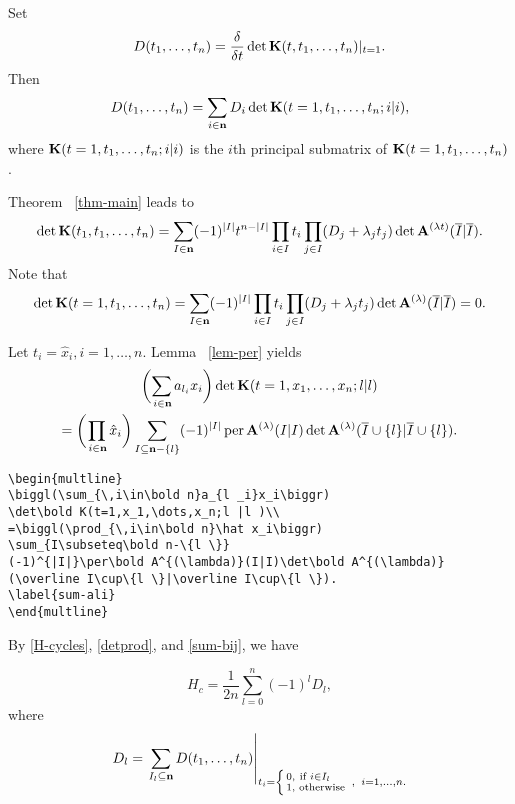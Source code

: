 Set
\begin{equation*}
D(t_1,\dots,t_n)=\frac{\delta}{\delta t}\det\bold K(t,t_1,\dots,t_n)
|_{t=1}.
\end{equation*}
Then
\begin{equation}\label{sum-Di}
D(t_1,\dots,t_n)=\sum_{i\in\bold n}D_i\det\bold K(t=1,t_1,\dots,t_n;
i|i),
\end{equation}
where $\bold K(t=1,t_1,\dots,t_n; i|i)$ is the $i$th principal
submatrix of $\bold K(t=1,t_1,\dots,t_n)$.

Theorem ~\ref{thm-main} leads to
\begin{equation}\label{detK1}
\det\bold K(t_1,t_1,\dots,t_n)=\sum_{I\in\bold n}(-1)^{|I|}t^{n-|I|}
\prod_{i\in I}t_i\prod_{j\in I}(D_j+\lambda_jt_j)\det\bold A
^{(\lambda t)}(\overline{I}|\overline I).
\end{equation}
Note that
\begin{equation}\label{detK2}
\det\bold K(t=1,t_1,\dots,t_n)=\sum_{I\in\bold n}(-1)^{|I|}
\prod_{i\in I}t_i\prod_{j\in I}(D_j+\lambda_jt_j)\det\bold A
^{(\lambda)}(\overline{I}|\overline{I})=0.
\end{equation}

Let $t_i=\hat x_i,i=1,\dots,n$. Lemma ~\ref{lem-per} yields
\begin{multline}
\biggl(\sum_{\,i\in\bold n}a_{l _i}x_i\biggr)
\det\bold K(t=1,x_1,\dots,x_n;l |l )\\
=\biggl(\prod_{\,i\in\bold n}\hat x_i\biggr)
\sum_{I\subseteq\bold n-\{l \}}
(-1)^{|I|}\operatorname{per}\bold A^{(\lambda)}(I|I)\det\bold A^{(\lambda)}
(\overline I\cup\{l \}|\overline I\cup\{l \}).
\label{sum-ali}
\end{multline}
%
\begin{verbatim}
\begin{multline}
\biggl(\sum_{\,i\in\bold n}a_{l _i}x_i\biggr)
\det\bold K(t=1,x_1,\dots,x_n;l |l )\\
=\biggl(\prod_{\,i\in\bold n}\hat x_i\biggr)
\sum_{I\subseteq\bold n-\{l \}}
(-1)^{|I|}\per\bold A^{(\lambda)}(I|I)\det\bold A^{(\lambda)}
(\overline I\cup\{l \}|\overline I\cup\{l \}).
\label{sum-ali}
\end{multline}
\end{verbatim}

By \eqref{H-cycles}, \eqref{detprod}, and \eqref{sum-bij}, we have
\begin{prop}\label{prop:eg}
\begin{equation}
H_c=\frac1{2n}\sum^n_{l =0}(-1)^{l}
D_{l},
\end{equation}
where
\begin{equation}\label{delta-l}
D_{l}=\left.\sum_{I_{l}\subseteq \bold n}
D(t_1,\dots,t_n)\right|
_{t_i=\left\{\begin{smallmatrix}
0,& \text{if }i\in I_{l}\quad\\%
1,& \text{otherwise}\end{smallmatrix}\right.\;,\;\; i=1,\dots,n.}
\end{equation}
\end{prop}

